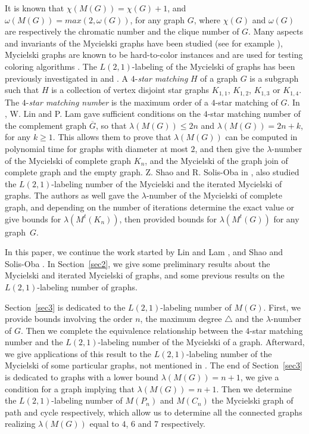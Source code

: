 \documentclass{article}
\newtheorem{open problem} {Open Problem}
\numberwithin{lemma}{section}
\numberwithin{theorem}{section}
\numberwithin{cor}{section}
\numberwithin{prop}{section}
\numberwithin{con}{section}
\numberwithin{claim}{section}
\numberwithin{obs}{section}
\numberwithin{dnt}{section}
\begin{document}
It is known that $\chi(M(G))=\chi(G)+1$, and $\omega(M (G))=max(2,\omega(G))$, for any graph $G$, where $\chi(G)$ and $\omega(G)$ are respectively the chromatic number and the clique number of $G$. Many aspects and invariants of the Mycielski graphs have been studied (see for example \cite{boro,cara,changhuang,fisher,larsen,lin,shao}), Mycielski graphs are known to be hard-to-color instances and are used for testing coloring algorithms \cite{cara}. The $L(2,1)$-labeling of the Mycielski of graphs has been previously investigated in \cite{lin} and \cite{shao}. A $4$-\textit{star matching}  $H$ of a graph $G$ is a subgraph such that $H$ is a collection of vertex disjoint star graphs $K_{1,1}$, $K_{1,2}$, $K_{1,3}$ or $K_{1,4}$. The $4$-\textit{star matching number} is the maximum order of a $4$-star matching of $G$. In \cite{lin}, W. Lin and P. Lam gave sufficient conditions on the $4$-star matching number of the complement graph $\overline{G}$, so that $\lambda(M(G))\leq 2n$ and $\lambda(M(G))=2n+k$, for any $k\geq 1$. This allows them to prove that $\lambda(M(G))$ can be computed in polynomial time for graphs with diameter at most $2$, and then give the $\lambda$-number of the Mycielski of complete graph $K_n$, and the Mycielski of the graph join of complete graph and the empty graph. Z. Shao and R. Solis-Oba in \cite{shao}, also studied the $L(2,1)$-labeling number of the Mycielski and the iterated Mycielski of graphs. The authors as well gave the $\lambda$-number of the Mycielski of complete graph, and depending on the number of iterations determine  the exact value or give bounds for $\lambda(M^t(K_n))$, then provided bounds for $\lambda(M^t(G))$ for any graph~$G$. \par
In this paper, we continue the work started by Lin and Lam \cite{lin}, and Shao and Solis-Oba \cite{shao}.
In Section~\ref{sec2}, we give some preliminary results about the Mycielski and iterated Mycielski of graphs, and some previous results on the $L(2,1)$-labeling number of graphs.
\par Section~\ref{sec3} is dedicated to  the $L(2,1)$-labeling number of $M(G)$. First, we provide bounds involving the order $n$, the maximum degree $\bigtriangleup$ and the $\lambda$-number of $G$. Then we complete the equivalence relationship between the $4$-star matching number and the $L(2,1)$-labeling number of the Mycielski of a graph. Afterward, we give applications of this result to the $L(2,1)$-labeling number of the Mycielski of some particular graphs, not mentioned in \cite{lin}. The end of Section~\ref{sec3} is dedicated to graphs with a lower bound  $\lambda(M(G))=n+1$, we give a condition for a graph implying that $\lambda(M(G))=n+1$. Then we determine the $L(2,1)$-labeling number of $M(P_n)$ and $M(C_n)$ the Mycielski graph of path and cycle respectively, which allow us to determine all the connected graphs realizing $\lambda(M(G))$ equal to $4$, $6$ and $7$ respectively. 
\end{document}
